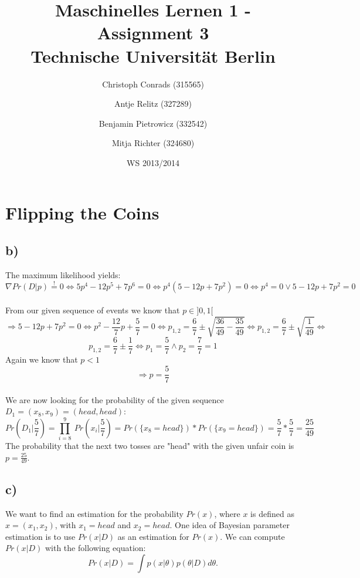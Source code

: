 \documentclass[paper=a4,fontsize=10pt,DIV11,BCOR10mm]{scrartcl}
\begin{document}
\title{Maschinelles Lernen 1 - Assignment 3\\
\small{Technische Universität Berlin}}


\author{\small{Christoph Conrads (315565)}\and \small{Antje Relitz (327289)}  \and \small{Benjamin Pietrowicz (332542)} \and \small{Mitja Richter (324680)} }

\date{WS 2013/2014}

\maketitle

\section{Flipping the Coins}




\subsection*{b)}
The maximum likelihood yields:
\[ \nabla Pr (D|p) \stackrel{!}{=} 0 \Leftrightarrow  5p^4 - 12 p^5 + 7p^6 = 0 \Leftrightarrow p^4(5-12p+7p^2) = 0 \Leftrightarrow p^4 = 0 \lor 5-12p+7p^2 = 0 \]\\
From our given sequence of events we know that $p\in ]0,1[$\\ 
\[\Rightarrow 5-12p+ 7p^2 = 0 \Leftrightarrow p^2 - \frac{12}{7}p + \frac{5}{7} = 0 \Leftrightarrow p_{1,2} = \frac{6}{7} \pm \sqrt{\frac{36}{49} - \frac{35}{49}} \Leftrightarrow p_{1,2} = \frac{6}{7} \pm \sqrt{\frac{1}{49}} \Leftrightarrow\]
\[ p_{1,2} = \frac{6}{7} \pm \frac{1}{7} \Leftrightarrow p_1 = \frac{5}{7} \land p_2 = \frac{7}{7} = 1\]
Again we know that $p<1$
\[ \Rightarrow p = \frac{5}{7} \]
\\We are now looking for the probability of the given sequence $D_1 = (x_8,x_9) = (head,head)$:
\[Pr(D_1|\frac{5}{7}) = \prod_{i=8}^9\ Pr(x_i|\frac{5}{7}) =Pr(\{x_8=head\})*Pr(\{x_9 = head\}) = \frac{5}{7} * \frac{5}{7} = \frac{25}{49} \]
The probability that the next two tosses are "head" with the given unfair coin is
$ p = \frac{25}{49}$.

\subsection*{c)}
We want to find an estimation for the probability $Pr(x)$, where $x$ is defined as $x=(x_1,x_2)$, with $x_1=head$ and $x_2=head$. One idea of Bayesian parameter estimation is to use $Pr(x|D)$ as an estimation for $Pr(x)$.
We can compute $Pr(x|D)$ with the following equation:
\begin{equation*}
Pr(x|D)=\int p(x|\theta)p(\theta|D)d\theta\text{.}
\end{equation*}
\end{document}
